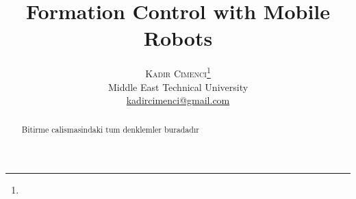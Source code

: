\documentclass[twoside]{article}
\title{\vspace{-15mm}\fontsize{24pt}{10pt}\selectfont\textbf{Formation Control with Mobile Robots}} %
\author{
	\large
	\textsc{Kadir Cimenci}\thanks{}\\[2mm] %
	\normalsize Middle East Technical University \\ %
	\normalsize \href{mailto:kadircimenci@gmail.com}{kadircimenci@gmail.com} %
	\vspace{-5mm}
}
\date{}
\begin{document}
	
	\maketitle %
	
	\thispagestyle{fancy} %
	
	
	\begin{abstract}
		
	Bitirme calismasindaki tum denklemler buradadır
		
		
	\end{abstract}
	
	
\end{document}
